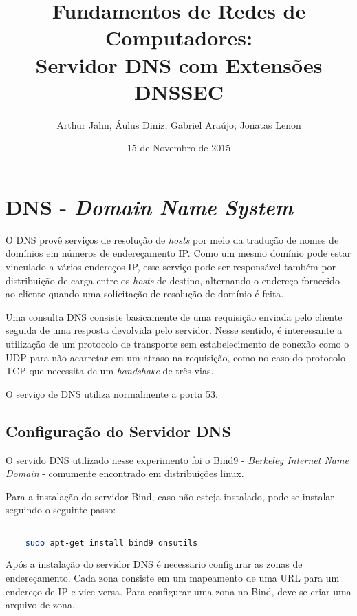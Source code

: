 \documentclass[a4paper]{report} %
\title{Fundamentos de Redes de Computadores: \\ Servidor DNS com Extensões DNSSEC}
\author{Arthur Jahn, Áulus Diniz, Gabriel Araújo, Jonatas Lenon}
\date{15 de Novembro de 2015}    %
\begin{document}
\maketitle  %

\tableofcontents %
\chapter{ DNS  - \textit{Domain Name System}}
\label{chap_dns}

O DNS provê serviços de resolução de \textit{hosts} por meio da tradução de nomes de domínios em números de endereçamento IP. Como um mesmo domínio pode estar vinculado a vários endereços IP, esse serviço pode ser responsável também por distribuição de carga entre os \textit{hosts} de destino, alternando o endereço fornecido ao cliente quando uma solicitação de resolução de domínio é feita.

Uma consulta DNS consiste basicamente de uma requisição enviada pelo cliente seguida de uma resposta devolvida pelo servidor. Nesse sentido, é interessante a utilização de um protocolo de transporte sem estabelecimento de conexão como o UDP para não acarretar em um atraso na requisição, como no caso do protocolo TCP que necessita de um \textit{handshake} de três vias.

		O serviço de DNS utiliza normalmente a porta 53.
\section{Configuração do Servidor DNS}
\label{sec_configuracao}

O servido DNS utilizado nesse experimento foi o Bind9 - \textit{Berkeley Internet Name Domain} - comumente encontrado em distribuições linux.

Para a instalação do servidor Bind, caso não esteja instalado, pode-se instalar seguindo o seguinte passo:

\begin{lstlisting}[language=bash]

	sudo apt-get install bind9 dnsutils

\end{lstlisting}

Após a instalação do servidor DNS é necessario configurar as zonas de endereçamento. Cada zona consiste em um mapeamento de uma URL para um endereço de IP e vice-versa. Para configurar uma zona no Bind, deve-se criar uma arquivo de zona.
\end{document}
